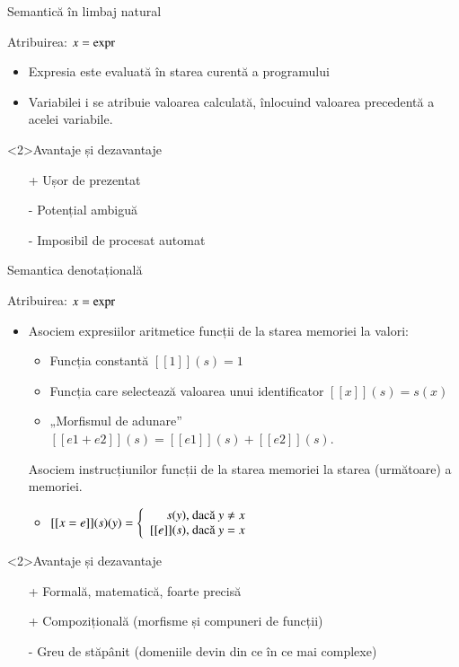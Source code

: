 \documentclass[xcolor=pdftex,romanian,colorlinks]{beamer}
\begin{document}
\begin{frame}{Semantică în limbaj natural}

\begin{block}{Atribuirea: \alert{$x	= {\rm expr}$}}
  \begin{itemize}
    \item<2> Expresia este evaluată în starea curentă a programului
	\item<2> Variabilei i se atribuie valoarea calculată, înlocuind valoarea precedentă a acelei variabile.
  \end{itemize}
\end{block}

\begin{block}<2>{Avantaje și dezavantaje}
\begin{itemize}
\item[+] Ușor de prezentat
\item[\alert{-}] Potențial ambiguă
\item[\alert{-}] Imposibil de procesat automat
\end{itemize}
\end{block}
\end{frame}

\begin{frame}{Semantica denotațională}
\begin{block}{Atribuirea: \alert{$x	= {\rm expr}$}}
\begin{itemize}
\item Asociem expresiilor aritmetice funcții de la starea memoriei la valori:
\begin{itemize}
\item<2> Funcția constantă $[[1]](s) = 1$
\item<2> Funcția care selectează valoarea unui identificator $[[x]](s) = s(x)$
\item<2> „Morfismul de adunare” $[[e1 + e2]](s) = [[e1]](s) + [[e2]](s)$.
\end{itemize}
\vitem Asociem instrucțiunilor funcții de la starea memoriei la starea (următoare) a memoriei.
\begin{itemize}
  \item<2> $[[x = e]](s)(y) = \left\{\begin{array}{r@{\mbox{, dacă }}l} s(y) & y \neq x
  \\{} [[e]](s) & y = x\end{array}\right.$
\end{itemize}
\end{itemize}
\end{block}
\begin{block}<2>{Avantaje și dezavantaje}
\begin{itemize}
\item[+] Formală, matematică, foarte precisă
\item[+] Compozițională (morfisme și compuneri de funcții)
\item[\alert{-}] Greu de stăpânit (domeniile devin din ce în ce mai complexe)
\end{itemize}
\end{block}

\end{frame}
\end{document}
